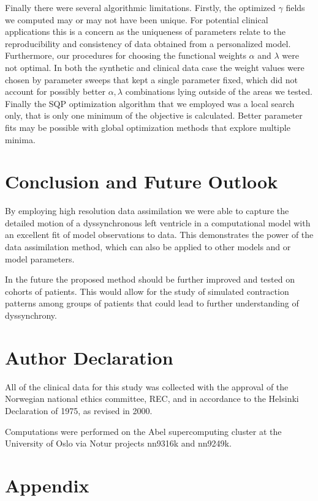 Finally there were several algorithmic limitations. 
Firstly, the optimized $\gamma$ fields we computed may or may not have been unique.
For potential clinical applications this is a concern as the uniqueness of parameters
relate to the reproducibility and consistency of data obtained from a personalized
model. Furthermore, our procedures for
choosing the functional weights $\alpha$ and $\lambda$ were not optimal.
In both the synthetic
and clinical data case the weight values
were chosen by parameter sweeps that kept a single parameter fixed, which did not
account for possibly better $\alpha,\lambda$ combinations
lying outside of the areas we tested. 
Finally the SQP optimization algorithm that we employed 
was a local search only, that is only
one minimum of the objective is calculated. Better parameter fits may be possible
with global optimization methods that explore multiple minima.

\section{Conclusion and Future Outlook}
\label{sec:conclusion}
By employing high resolution data assimilation we
were able to capture the detailed motion of a dyssynchronous left
ventricle in a computational model with an excellent fit of model observations
to data. This demonstrates the power of the data assimilation method,
which can also be applied to other models and or model parameters.

In the future the proposed method should be further improved and 
tested on cohorts of patients. This would allow for the study of simulated contraction patterns 
among groups of patients that could lead to further understanding of
dyssynchrony.

\section{Author Declaration}
All of the clinical data for this study was collected with the approval of the Norwegian national ethics committee, REC,
and in accordance to the Helsinki Declaration of 1975, as revised in 2000.

Computations were performed on the Abel supercomputing cluster at the
University of Oslo via Notur projects nn9316k and nn9249k.

\section{Appendix}

